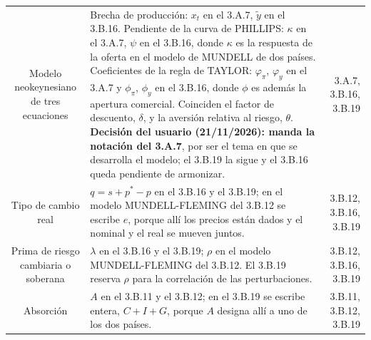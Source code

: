 \documentclass[10pt,a4paper]{article}
\begin{document}
\begin{longtable}{SMD}
Modelo neokeynesiano de tres ecuaciones & Brecha de producción: $x_t$ en el 3.A.7, $\tilde y$ en el 3.B.16. Pendiente de la curva de PHILLIPS: $\kappa$ en el 3.A.7, $\psi$ en el 3.B.16, donde $\kappa$ es la respuesta de la oferta en el modelo de MUNDELL de dos países. Coeficientes de la regla de TAYLOR: $\varphi_\pi$, $\varphi_y$ en el 3.A.7 y $\phi_\pi$, $\phi_y$ en el 3.B.16, donde $\phi$ es además la apertura comercial. Coinciden el factor de descuento, $\delta$, y la aversión relativa al riesgo, $\theta$. \textbf{Decisión del usuario (21/11/2026): manda la notación del 3.A.7}, por ser el tema en que se desarrolla el modelo; el 3.B.19 la sigue y el 3.B.16 queda pendiente de armonizar. & 3.A.7, 3.B.16, 3.B.19\\
Tipo de cambio real & $q=s+p^{*}-p$ en el 3.B.16 y el 3.B.19; en el modelo MUNDELL-FLEMING del 3.B.12 se escribe $e$, porque allí los precios están dados y el nominal y el real se mueven juntos. & 3.B.12, 3.B.16, 3.B.19\\
Prima de riesgo cambiaria o soberana & $\lambda$ en el 3.B.16 y el 3.B.19; $\rho$ en el modelo MUNDELL-FLEMING del 3.B.12. El 3.B.19 reserva $\rho$ para la correlación de las perturbaciones. & 3.B.12, 3.B.16, 3.B.19\\
Absorción & $A$ en el 3.B.11 y el 3.B.12; en el 3.B.19 se escribe entera, $C+I+G$, porque $A$ designa allí a uno de los dos países. & 3.B.11, 3.B.12, 3.B.19\\
\end{longtable}
\end{document}
